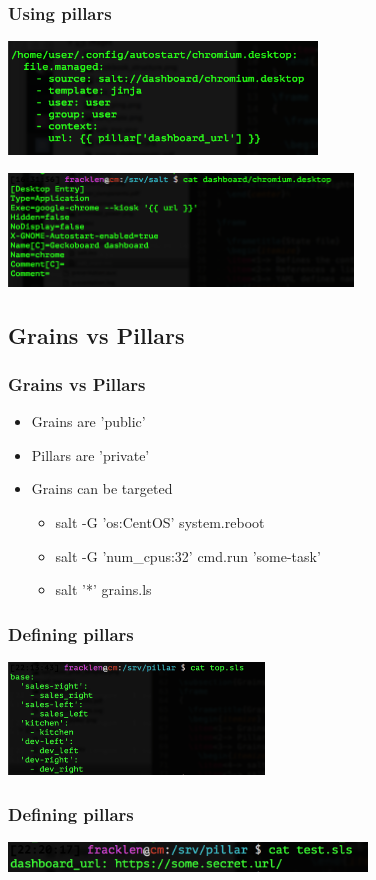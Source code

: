 \frame
{
  \frametitle{Using pillars}

  \begin{center}%
    \includegraphics[height=3cm]{images/salt_state_pillar.png}
  \end{center}%

  \begin{center}%
    \includegraphics[height=3cm]{images/salt_state_pillar_template.png}
  \end{center}%
}

\subsection{Grains vs Pillars}
\frame
{
  \frametitle{Grains vs Pillars}
  \begin{itemize}
  \item<1-> Grains are 'public'
  \item<2-> Pillars are 'private'
  \item<3-> Grains can be targeted
    \begin{itemize}
    \item<4-> salt -G 'os:CentOS' system.reboot
    \item<5-> salt -G 'num\_cpus:32' cmd.run 'some-task'
    \item<6-> salt '*' grains.ls
    \end{itemize}
  \end{itemize}
}

\frame
{
  \frametitle{Defining pillars}

  \begin{center}%
    \includegraphics[height=3cm]{images/salt_pillars_top.png}
  \end{center}%
}

\frame
{
  \frametitle{Defining pillars}

  \begin{center}%
    \includegraphics[height=0.8cm]{images/salt_pillars_def.png}
  \end{center}%
}
